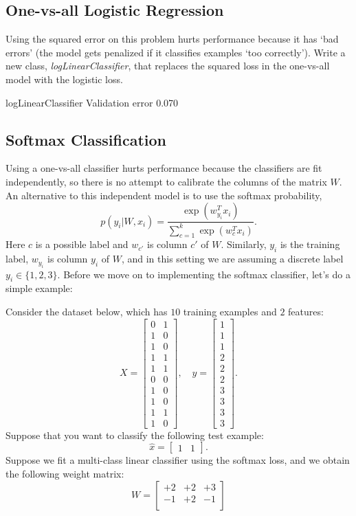 \documentclass{article}
\begin{document}
\subsection{One-vs-all Logistic Regression}

Using the squared error on this problem hurts performance because it has `bad errors' (the model gets penalized if it classifies examples `too correctly'). 
Write a new class, \emph{logLinearClassifier}, that replaces the squared loss in the one-vs-all model with the logistic loss. 

logLinearClassifier Validation error 0.070

\subsection{Softmax Classification}

Using a one-vs-all classifier hurts performance because the classifiers are fit independently, so there is no attempt to calibrate the columns of the matrix $W$. An alternative to this independent model is to use the softmax probability,
\[
p(y_i | W, x_i) = \frac{\exp(w_{y_i}^Tx_i)}{\sum_{c=1}^k\exp(w_c^Tx_i)}.
\]
Here $c$ is a possible label and $w_{c'}$ is column $c'$ of $W$. Similarly, $y_i$ is the training label, $w_{y_i}$ is column $y_i$ of $W$, and in this setting we are assuming a discrete label $y_i \in \{1,2,3\}$. Before we move on to implementing the softmax classifier, let's do a simple example:

Consider the dataset below, which has $10$ training examples and $2$ features:
\[
X = \begin{bmatrix}0 & 1\\1 & 0\\ 1 & 0\\ 1 & 1\\ 1 & 1\\ 0 & 0\\  1 & 0\\  1 & 0\\  1 & 1\\  1 &0\end{bmatrix}, \quad y = \begin{bmatrix}1\\1\\1\\2\\2\\2\\3\\3\\3\\3\end{bmatrix}.
\]
Suppose that you want to classify the following test example:
\[
\hat{x} = \begin{bmatrix}1 & 1\end{bmatrix}.
\]
Suppose we fit a multi-class linear classifier using the softmax loss, and we obtain the following weight matrix:
\[
W = 
\begin{bmatrix}
+2 & +2 & +3\\
-1 & +2 & -1\\
\end{bmatrix}
\]
\end{document}
